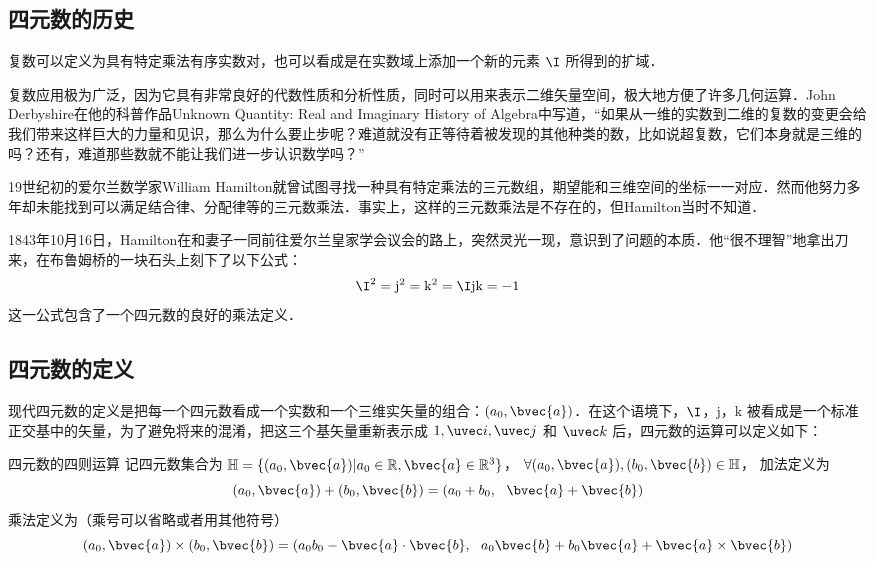 

\subsection{四元数的历史}

复数可以定义为具有特定乘法有序实数对，也可以看成是在实数域上添加一个新的元素 $  \I$ 所得到的扩域．

复数应用极为广泛，因为它具有非常良好的代数性质和分析性质，同时可以用来表示二维矢量空间，极大地方便了许多几何运算．John Derbyshire在他的科普作品Unknown Quantity: Real and Imaginary History of Algebra中写道，“如果从一维的实数到二维的复数的变更会给我们带来这样巨大的力量和见识，那么为什么要止步呢？难道就没有正等待着被发现的其他种类的数，比如说超复数，它们本身就是三维的吗？还有，难道那些数就不能让我们进一步认识数学吗？”

19世纪初的爱尔兰数学家William Hamilton就曾试图寻找一种具有特定乘法的三元数组，期望能和三维空间的坐标一一对应．然而他努力多年却未能找到可以满足结合律、分配律等的三元数乘法．事实上，这样的三元数乘法是不存在的，但Hamilton当时不知道．

1843年10月16日，Hamilton在和妻子一同前往爱尔兰皇家学会议会的路上，突然灵光一现，意识到了问题的本质．他“很不理智”地拿出刀来，在布鲁姆桥的一块石头上刻下了以下公式：
\begin{equation}
\I^2=\mathrm{j}^2=\mathrm{k}^2=\I\mathrm{j}\mathrm{k}=-1
\end{equation}
这一公式包含了一个四元数的良好的乘法定义．

\subsection{四元数的定义}

现代四元数的定义是把每一个四元数看成一个实数和一个三维实矢量的组合：$(a_0, \bvec{a})$．在这个语境下，$\I$，$\mathrm{j}$，$\mathrm{k}$ 被看成是一个标准正交基中的矢量，为了避免将来的混淆，把这三个基矢量重新表示成 $1, \uvec i, \uvec j$ 和 $\uvec k$ 后，四元数的运算可以定义如下：

\begin{definition}{四元数的四则运算}
记四元数集合为 $\mathbb{H}=\{(a_0, \bvec{a})|a_0\in\mathbb{R}, \bvec{a}\in\mathbb{R}^3\}$， $\forall(a_0, \bvec{a}), (b_0, \bvec{b})\in\mathbb{H}$， 加法定义为
\begin{equation}
(a_0, \bvec{a})+ (b_0, \bvec{b})=(a_0+b_0,\ \ \bvec{a}+\bvec{b})
\end{equation}
乘法定义为（乘号可以省略或者用其他符号）
\begin{equation}\label{Quat_eq1}
(a_0, \bvec{a})\times (b_0, \bvec{b})=(a_0b_0-\bvec{a}\cdot\bvec{b},\ \ a_0\bvec{b}+b_0\bvec{a}+\bvec{a}\times\bvec{b})
\end{equation}
\end{definition}


